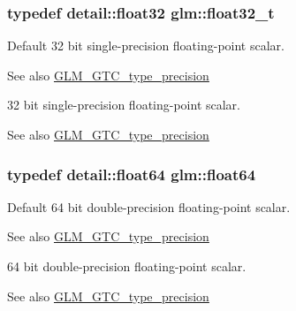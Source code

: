 \subsubsection[{\texorpdfstring{float32\+\_\+t}{float32_t}}]{\setlength{\rightskip}{0pt plus 5cm}typedef detail\+::float32 {\bf glm\+::float32\+\_\+t}}\hypertarget{group__gtc__type__precision_ga642737ae3e7c434b366f2191e6944bf2}{}\label{group__gtc__type__precision_ga642737ae3e7c434b366f2191e6944bf2}
Default 32 bit single-\/precision floating-\/point scalar. \begin{DoxySeeAlso}{See also}
\hyperlink{group__gtc__type__precision}{G\+L\+M\+\_\+\+G\+T\+C\+\_\+type\+\_\+precision}
\end{DoxySeeAlso}
32 bit single-\/precision floating-\/point scalar. \begin{DoxySeeAlso}{See also}
\hyperlink{group__gtc__type__precision}{G\+L\+M\+\_\+\+G\+T\+C\+\_\+type\+\_\+precision} 
\end{DoxySeeAlso}
\subsubsection[{\texorpdfstring{float64}{float64}}]{\setlength{\rightskip}{0pt plus 5cm}typedef detail\+::float64 {\bf glm\+::float64}}\hypertarget{group__gtc__type__precision_gab721f828b41f46b20cf4883b50733d3b}{}\label{group__gtc__type__precision_gab721f828b41f46b20cf4883b50733d3b}
Default 64 bit double-\/precision floating-\/point scalar. \begin{DoxySeeAlso}{See also}
\hyperlink{group__gtc__type__precision}{G\+L\+M\+\_\+\+G\+T\+C\+\_\+type\+\_\+precision}
\end{DoxySeeAlso}
64 bit double-\/precision floating-\/point scalar. \begin{DoxySeeAlso}{See also}
\hyperlink{group__gtc__type__precision}{G\+L\+M\+\_\+\+G\+T\+C\+\_\+type\+\_\+precision} 
\end{DoxySeeAlso}
